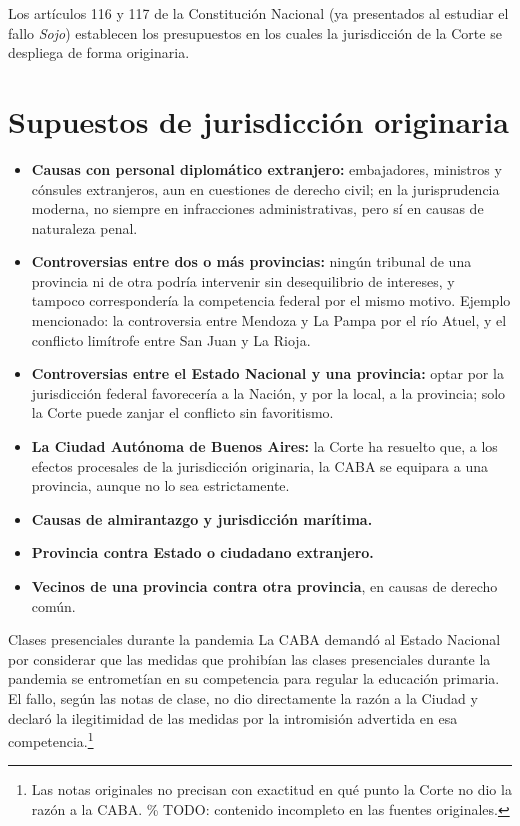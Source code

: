 \documentclass[12pt,oneside]{book}
\begin{document}
\begin{important}
Los artículos 116 y 117 de la Constitución Nacional (ya presentados al estudiar el fallo \emph{Sojo}) establecen los presupuestos en los cuales la jurisdicción de la Corte se despliega de forma originaria.
\end{important}

\section{Supuestos de jurisdicción originaria}

\begin{itemize}
    \item \textbf{Causas con personal diplomático extranjero:} embajadores, ministros y cónsules extranjeros, aun en cuestiones de derecho civil; en la jurisprudencia moderna, no siempre en infracciones administrativas, pero sí en causas de naturaleza penal.
    \item \textbf{Controversias entre dos o más provincias:} ningún tribunal de una provincia ni de otra podría intervenir sin desequilibrio de intereses, y tampoco correspondería la competencia federal por el mismo motivo. Ejemplo mencionado: la controversia entre Mendoza y La Pampa por el río Atuel, y el conflicto limítrofe entre San Juan y La Rioja.
    \item \textbf{Controversias entre el Estado Nacional y una provincia:} optar por la jurisdicción federal favorecería a la Nación, y por la local, a la provincia; solo la Corte puede zanjar el conflicto sin favoritismo.
    \item \textbf{La Ciudad Autónoma de Buenos Aires:} la Corte ha resuelto que, a los efectos procesales de la jurisdicción originaria, la CABA se equipara a una provincia, aunque no lo sea estrictamente.
    \item \textbf{Causas de almirantazgo y jurisdicción marítima.}
    \item \textbf{Provincia contra Estado o ciudadano extranjero.}
    \item \textbf{Vecinos de una provincia contra otra provincia}, en causas de derecho común.
\end{itemize}

\begin{example}{Clases presenciales durante la pandemia}
La CABA demandó al Estado Nacional por considerar que las medidas que prohibían las clases presenciales durante la pandemia se entrometían en su competencia para regular la educación primaria. El fallo, según las notas de clase, no dio directamente la razón a la Ciudad y declaró la ilegitimidad de las medidas por la intromisión advertida en esa competencia.\footnote{Las notas originales no precisan con exactitud en qué punto la Corte no dio la razón a la CABA. \% TODO: contenido incompleto en las fuentes originales.}
\end{example}
\end{document}
